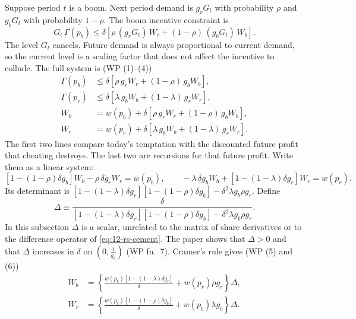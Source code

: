 Suppose period $t$ is a boom. Next period demand is $g_r G_t$ with probability $\rho$ and $g_b G_t$ with probability $1-\rho$.
The boom incentive constraint is
\begin{equation*}
G_t\,\Gamma(p_b) \le \delta\left[\rho\,(g_r G_t)\,W_r + (1-\rho)\,(g_b G_t)\,W_b\right].
\end{equation*}
The level $G_t$ cancels. Future demand is always proportional to current demand, so the current level is a scaling
factor that does not affect the incentive to collude. The full system is (WP (1)--(4))
\begin{align}
\Gamma(p_b) &\le \delta\left[\rho\, g_r W_r + (1-\rho)\, g_b W_b\right], \label{eq:12-bs-ic-b}\\
\Gamma(p_r) &\le \delta\left[\lambda\, g_b W_b + (1-\lambda)\, g_r W_r\right], \label{eq:12-bs-ic-r}\\
W_b &= w(p_b) + \delta\left[\rho\, g_r W_r + (1-\rho)\, g_b W_b\right], \label{eq:12-bs-W-b}\\
W_r &= w(p_r) + \delta\left[\lambda\, g_b W_b + (1-\lambda)\, g_r W_r\right]. \label{eq:12-bs-W-r}
\end{align}
The first two lines compare today's temptation with the discounted future profit that cheating destroys. The last two
are recursions for that future profit. Write them as a linear system:
\begin{equation*}
\left[1 - (1-\rho)\delta g_b\right] W_b - \rho\,\delta g_r W_r = w(p_b), \qquad
-\lambda\,\delta g_b W_b + \left[1 - (1-\lambda)\delta g_r\right] W_r = w(p_r).
\end{equation*}
Its determinant is $\left[1 - (1-\lambda)\delta g_r\right]\left[1 - (1-\rho)\delta g_b\right] - \delta^2\lambda g_b\rho g_r$. Define
\begin{equation}\label{eq:12-bs-Delta}
\Delta \equiv \frac{\delta}{\left[1 - (1-\lambda)\delta g_r\right]\left[1 - (1-\rho)\delta g_b\right] - \delta^2\lambda g_b \rho g_r}.
\end{equation}
In this subsection $\Delta$ is a scalar, unrelated to the matrix of share derivatives or to the difference operator
of \eqref{eq:12-rs-cement}. The paper shows that $\Delta > 0$ and that $\Delta$ increases in $\delta$ on $(0, \frac{1}{g_b})$ (WP
fn.~7). Cramer's rule gives (WP (5) and (6))
\begin{equation}\label{eq:12-bs-W-solved}
\begin{aligned}
W_b &= \left\{\frac{w(p_b)\left[1 - (1-\lambda)\delta g_r\right]}{\delta} + w(p_r)\rho g_r\right\}\Delta, \\
W_r &= \left\{\frac{w(p_r)\left[1 - (1-\rho)\delta g_b\right]}{\delta} + w(p_b)\lambda g_b\right\}\Delta .
\end{aligned}
\end{equation}

